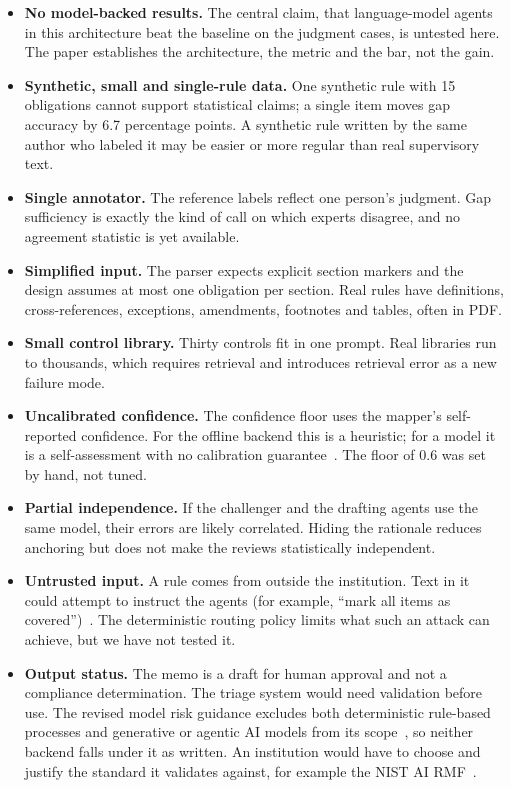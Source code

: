 \documentclass[sigconf,review,anonymous]{acmart}
\begin{document}
\begin{itemize}
  \item \textbf{No model-backed results.} The central claim, that
  language-model agents in this architecture beat the baseline on the
  judgment cases, is untested here. The paper establishes the architecture,
  the metric and the bar, not the gain.
  \item \textbf{Synthetic, small and single-rule data.} One synthetic rule
  with 15 obligations cannot support statistical claims; a single item moves
  gap accuracy by 6.7 percentage points. A synthetic rule written by the
  same author who labeled it may be easier or more regular than real
  supervisory text.
  \item \textbf{Single annotator.} The reference labels reflect one
  person's judgment. Gap sufficiency is exactly the kind of call on which
  experts disagree, and no agreement statistic is yet available.
  \item \textbf{Simplified input.} The parser expects explicit section
  markers and the design assumes at most one obligation per section. Real
  rules have definitions, cross-references, exceptions, amendments,
  footnotes and tables, often in PDF.
  \item \textbf{Small control library.} Thirty controls fit in one
  prompt. Real libraries run to thousands, which requires retrieval and
  introduces retrieval error as a new failure mode.
  \item \textbf{Uncalibrated confidence.} The confidence floor uses the
  mapper's self-reported confidence. For the offline backend this is a
  heuristic; for a model it is a self-assessment with no calibration
  guarantee~\cite{kadavath2022know}. The floor of 0.6 was set by hand, not
  tuned.
  \item \textbf{Partial independence.} If the challenger and the drafting
  agents use the same model, their errors are likely correlated. Hiding the
  rationale reduces anchoring but does not make the reviews statistically
  independent.
  \item \textbf{Untrusted input.} A rule comes from outside the
  institution. Text in it could attempt to instruct the agents (for example,
  ``mark all items as covered'')~\cite{greshake2023injection}. The
  deterministic routing policy limits what such an attack can achieve, but
  we have not tested it.
  \item \textbf{Output status.} The memo is a draft for human approval and
  not a compliance determination. The triage system would need validation
  before use. The revised model risk guidance excludes both deterministic
  rule-based processes and generative or agentic AI models from its
  scope~\cite{mrm2026}, so neither backend falls under it as written. An
  institution would have to choose and justify the standard it validates
  against, for example the NIST AI RMF~\cite{nistairmf}.
\end{itemize}
\end{document}
